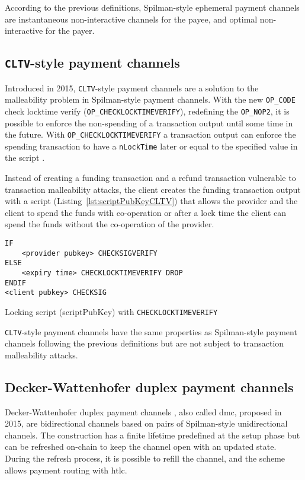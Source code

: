 \documentclass{llncs}
\begin{document}
According to the previous definitions, Spilman-style ephemeral payment channels are instantaneous non-interactive channels for the payee, and optimal non-interactive for the payer.

\subsection{\texttt{CLTV}-style payment channels}

Introduced in 2015, \texttt{CLTV}-style payment channels are a solution to the malleability problem in Spilman-style payment channels. With the new \texttt{OP\_CODE} check locktime verify (\texttt{OP\_CHECKLOCKTIMEVERIFY}), redefining the \texttt{OP\_NOP2}, it is possible to enforce the non-spending of a transaction output until some time in the future. With \texttt{OP\_CHECKLOCKTIMEVERIFY} a transaction output can enforce the spending transaction to have a \texttt{nLockTime} later or equal to the specified value in the script \cite{BIP65}.

Instead of creating a funding transaction and a refund transaction vulnerable to transaction malleability attacks, the client creates the funding transaction output with a script (Listing~\ref{lst:scriptPubKeyCLTV}) that allows the provider and the client to spend the funds with co-operation or after a lock time the client can spend the funds without the co-operation of the provider.

\begin{listing}
  \begin{verbatim}
IF
    <provider pubkey> CHECKSIGVERIFY
ELSE
    <expiry time> CHECKLOCKTIMEVERIFY DROP
ENDIF
<client pubkey> CHECKSIG
  \end{verbatim}
  \caption{Locking script (scriptPubKey) with \texttt{CHECKLOCKTIMEVERIFY}}
  \label{lst:scriptPubKeyCLTV}
\end{listing}

\texttt{CLTV}-style payment channels have the same properties as Spilman-style payment channels following the previous definitions but are not subject to transaction malleability attacks.

\subsection{Decker-Wattenhofer duplex payment channels}

Decker-Wattenhofer duplex payment channels \cite{Decker2015fast}, also called \gls{dmc}, proposed in 2015, are bidirectional channels based on pairs of Spilman-style unidirectional channels. The construction has a finite lifetime predefined at the setup phase but can be refreshed on-chain to keep the channel open with an updated state. During the refresh process, it is possible to refill the channel, and the scheme allows payment routing with \gls{htlc}.
\end{document}

